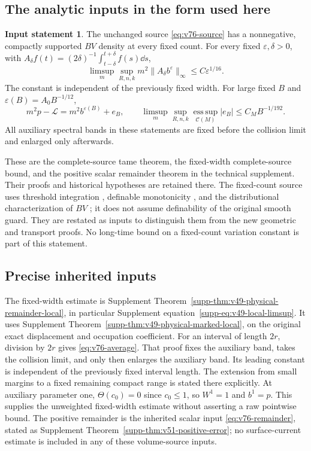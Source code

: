 \documentclass[11pt,reqno]{amsart}
\numberwithin{equation}{section}
\theoremstyle{definition}
\newtheorem{inputstatement}[theorem]{Input statement}
\theoremstyle{remark}\newtheorem{remark}[theorem]{Remark}
\newcommand{\esssup}{\operatorname*{ess\,sup}}
\begin{document}
\subsection{The analytic inputs in the form used here}
\begin{inputstatement}\label{input:v76-analytic}
The unchanged source \eqref{eq:v76-source} has a nonnegative,
compactly supported $BV$ density at every fixed count. For every
fixed $\varepsilon,\delta>0$, with
$A_\delta f(t)=(2\delta)^{-1}\int_{t-\delta}^{t+\delta}f(s)\dd s$,
\begin{equation}\label{eq:v76-average}
 \limsup_m\sup_{R,n,k}m^2\|A_\delta b^\varepsilon\|_\infty
                                      \le C\varepsilon^{1/16}.
\end{equation}
The constant is independent of the previously fixed width. For large
fixed $B$ and $\varepsilon(B)=A_0B^{-1/12}$,
\begin{equation}\label{eq:v76-remainder}
 m^2p-\mathcal L=m^2b^{\varepsilon(B)}+e_B,\qquad
 \limsup_m\sup_{R,n,k}\esssup_{\mathcal C(M)}|e_B|
                                     \le C_MB^{-1/192}.
\end{equation}
All auxiliary spectral bands in these statements are fixed before
the collision limit and enlarged only afterwards.
\end{inputstatement}
These are the complete-source tame theorem, the fixed-width
complete-source bound, and the positive scalar remainder theorem in
the technical supplement. Their proofs and historical hypotheses are
retained there. The fixed-count source uses threshold integration
\cite{CMInt}, definable monotonicity \cite{Coste}, and the
distributional characterization of $BV$ \cite{AFP}; it does not
assume definability of the original smooth guard. They are restated as inputs to distinguish them from
the new geometric and transport proofs. No long-time bound on a
fixed-count variation constant is part of this statement.



\subsection{Precise inherited inputs}\label{sec:v79-input-map}
The fixed-width estimate is Supplement Theorem~\ref{supp-thm:v49-physical-remainder-local},
in particular Supplement equation~\eqref{supp-eq:v49-local-limsup}.
It uses Supplement Theorem~\ref{supp-thm:v49-physical-marked-local}, on the
original exact displacement and occupation coefficient. For an interval
of length $2r$, division by $2r$ gives \eqref{eq:v76-average}. That
proof fixes the auxiliary band, takes the collision limit, and only
then enlarges the auxiliary band. Its leading constant is independent
of the previously fixed interval length. The extension from small
margins to a fixed remaining compact range is stated there explicitly.
At auxiliary parameter one, $\Theta(c_0)=0$ since $c_0\le1$, so $W^1=1$
and $b^1=p$. This supplies the unweighted fixed-width estimate without
asserting a raw pointwise bound. The positive remainder is the inherited
scalar input \eqref{eq:v76-remainder}, stated as Supplement
Theorem~\ref{supp-thm:v51-positive-error}; no surface-current estimate is
included in any of these volume-source inputs.
\end{document}
